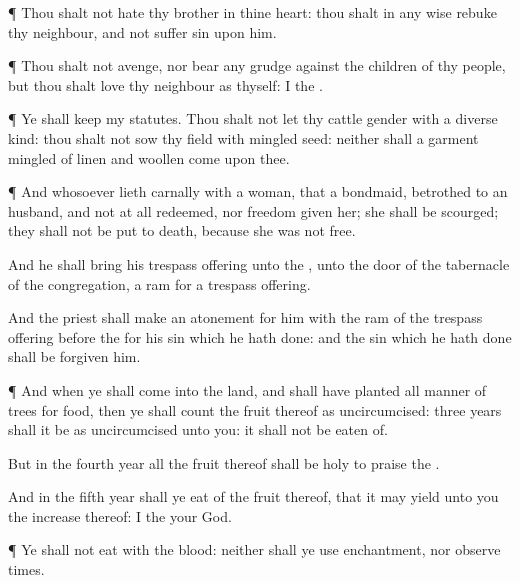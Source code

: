 {\par }{\PP {}¶ Thou shalt not
hate thy
brother in thine
heart: thou shalt in any
wise
rebuke thy
neighbour, and not
suffer
sin upon him.


\par }{\PP {}¶ Thou shalt not
avenge, nor bear any
grudge against the
children of thy
people, but thou shalt
love thy
neighbour as
thyself: I
{} the
{}.


\par }{\PP {}¶ Ye shall
keep my
statutes. Thou shalt not let thy
cattle
gender with a diverse
kind: thou shalt not
sow thy
field with mingled
seed: neither shall a
garment
mingled of linen and
woollen
come upon thee.


\par }{\PP {}¶ And
whosoever
lieth
carnally with a
woman, that
{} a
bondmaid,
betrothed to an
husband, and not at
all
redeemed, nor
freedom
given her; she shall be
scourged; they shall not be put to
death, because she was not
free.

And he shall
bring his trespass
offering unto the
{}, unto the
door of the
tabernacle of the
congregation,
{} a
ram for a trespass
offering.

And the
priest shall make an
atonement for him with the
ram of the trespass
offering
before the
{} for his
sin which he hath
done: and the
sin which he hath
done shall be
forgiven him.


\par }{\PP {}¶ And when ye shall
come into the
land, and shall have
planted all manner of
trees for
food, then ye shall
count the
fruit thereof as
uncircumcised:
three
years shall it be as
uncircumcised unto you: it shall not be
eaten of.

But in the
fourth
year all the
fruit thereof shall be
holy to
praise the
{}
{}.

And in the
fifth
year shall ye
eat of the
fruit thereof, that it may
yield unto you the
increase thereof: I
{} the
{} your
God.


\par }{\PP {}¶ Ye shall not
eat
{} with the
blood: neither shall ye use
enchantment, nor observe
times.

}
